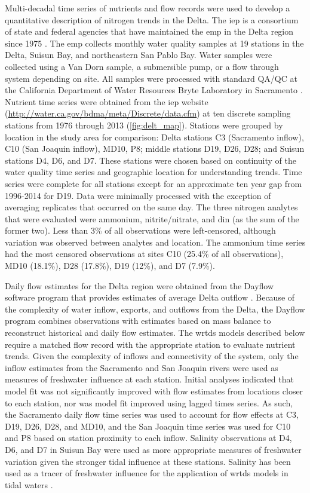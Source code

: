 \documentclass[journal = esthag, manuscript = article]{achemso}\usepackage[]{graphicx}\usepackage[]{color}
\begin{document}
Multi-decadal time series of nutrients and flow records were used to develop a quantitative description of nitrogen trends in the Delta.  The \ac{iep} is a consortium of state and federal agencies that have maintained the \ac{emp} in the Delta region since 1975 \cite{IEP13}.  The \ac{emp} collects monthly water quality samples at 19 stations in the Delta, Suisun Bay, and northeastern San Pablo Bay.  Water samples were collected using a Van Dorn sample, a submersible pump, or a flow through system depending on site.  All samples were processed with standard QA/QC at the California Department of Water Resources Bryte Laboratory in Sacramento \cite{IEP13}.  Nutrient time series were obtained from the \ac{iep} website (\url{http://water.ca.gov/bdma/meta/Discrete/data.cfm}) at ten discrete sampling stations from 1976 through 2013 (\cref{fig:delt_map}).  Stations were grouped by location in the study area for comparison: Delta stations C3 (Sacramento inflow), C10 (San Joaquin inflow), MD10, P8; middle stations D19, D26, D28; and Suisun stations D4, D6, and D7.  These stations were chosen based on continuity of the water quality time series and geographic location for understanding trends.  Time series were complete for all stations except for an approximate ten year gap from 1996-2014 for D19.  Data were minimally processed with the exception of averaging replicates that occurred on the same day.  The three nitrogen analytes that were evaluated were ammonium, nitrite/nitrate, and \ac{din} (as the sum of the former two). Less than 3\% of all observations were left-censored, although variation was observed between analytes and location.  The ammonium time series had the most censored observations at sites C10 (25.4\% of all observations), MD10 (18.1\%), D28 (17.8\%), D19 (12\%), and D7 (7.9\%).

Daily flow estimates for the Delta region were obtained from the Dayflow software program that provides estimates of average Delta outflow \cite{IEP16}.  Because of the complexity of water inflow, exports, and outflows from the Delta, the Dayflow program combines observations with estimates based on mass balance to reconstruct historical and daily flow estimates.  The \ac{wrtds} models described below require a matched flow record with the appropriate station to evaluate nutrient trends. Given the complexity of inflows and connectivity of the system, only the inflow estimates from the Sacramento and San Joaquin rivers were used as measures of freshwater influence at each station.  Initial analyses indicated that model fit was not significantly improved with flow estimates from locations closer to each station, nor was model fit improved using lagged times series.  As such, the Sacramento daily flow time series was used to account for flow effects at C3, D19, D26, D28, and MD10, and the San Joaquin time series was used for C10 and P8 based on station proximity to each inflow.  Salinity observations at D4, D6, and D7 in Suisun Bay were used as more appropriate measures of freshwater variation given the stronger tidal influence at these stations.  Salinity has been used as a tracer of freshwater influence for the application of \ac{wrtds} models in tidal waters \cite{Beck15}.  
\end{document}
